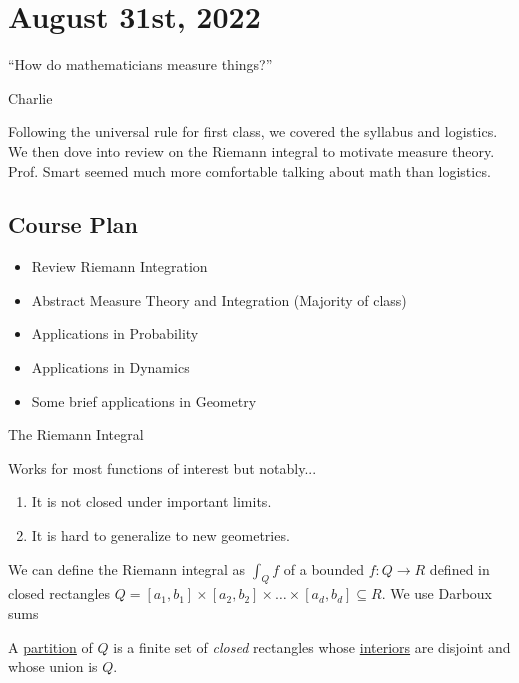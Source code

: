 \section{August 31st, 2022}

\epigraph{``How do mathematicians measure things?''}{Charlie}

Following the universal rule for first class, we covered the syllabus and logistics. We then dove into review on the Riemann integral to motivate measure theory. Prof. Smart seemed much more comfortable talking about math than logistics.

\subsection{Course Plan}
\begin{itemize}
	\item Review Riemann Integration
	\item Abstract Measure Theory and Integration (Majority of class)
	\item Applications in Probability
	\item Applications in Dynamics
	\item Some brief applications in Geometry
\end{itemize}

\begin{problem} The Riemann Integral
\item Works for most functions of interest but notably...
	\begin{enumerate}
		\item It is not closed under important limits.
		\item It is hard to generalize to new geometries.
	\end{enumerate}
\end{problem}

\begin{definition}
	We can define the Riemann integral as $\int_{{Q}}^{{}} {f}$ of a bounded $f : Q \to R$
	defined in closed rectangles
	$Q = [a_1,b_1] \times [a_2,b_2] \times \ldots \times [a_d,b_d] \subseteq R$. We use Darboux sums
\end{definition}

\vline
\begin{definition}[Partition]
	A \underline{partition} of $Q$ is a finite set of \emph{closed} rectangles whose \underline{interiors} are disjoint and whose union is $Q$.
\end{definition}

